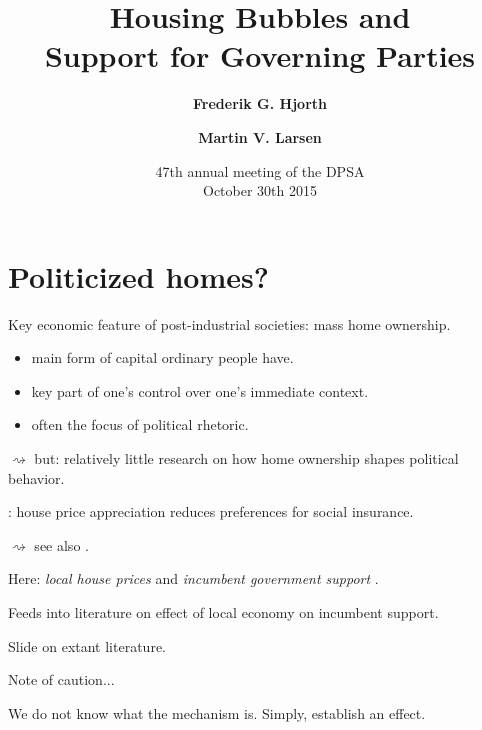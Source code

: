 \documentclass[aspectratio=169]{beamer}
\title[Housing bubbles]{Housing Bubbles and \\Support for Governing Parties}
\author{\textbf{Frederik G. Hjorth} \and \textbf{Martin V. Larsen}}
\institute[UCPH]{\small Department of Political Science \\ University of Copenhagen}
\date[Octoboer 2015]{ 47th annual meeting of the DPSA \\ October 30th 2015}
\begin{document}
	
	\begin{frame}
		\titlepage
	\end{frame}
	
	
\section{Politicized homes?}

	\begin{frame}
	Key economic feature of post-industrial societies: mass home ownership.
	
	\vspace{0.2in} 

	\begin{itemize}
		\item main form of capital ordinary people have.
		\item key part of one's control over one's immediate context.
		\item often the focus of political rhetoric.
	\end{itemize}
	
		\vspace{0.2in} \pause
		
	$\rightsquigarrow$ but: relatively little research on how home ownership shapes political behavior.
		\end{frame}	
	
		\begin{frame}
		\citet{ansell2014political}: house price appreciation reduces preferences for social insurance. 
		
		$\rightsquigarrow$ see also \citet{di2007formation}.
						
		\vspace{0.3in}	\pause
						
		Here: \emph{local house prices} and \emph{incumbent government support}	.					
		
		\vspace{0.3in} \pause	
		
		Feeds into literature on effect of local economy on incumbent support.
       			
		\end{frame}	
		
		
	\begin{frame}

	Slide on extant literature.	

			
	\end{frame}	
	
	\begin{frame}
			
	Note of caution...	
			
	We do not know what the mechanism is. Simply, establish an effect.
	\end{frame}	
	
\end{document}
